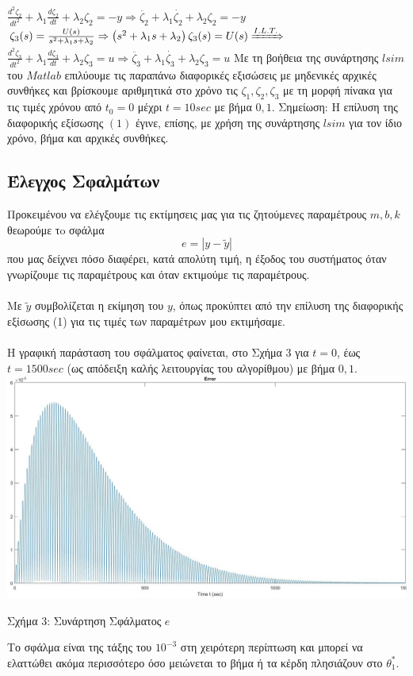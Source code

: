 \documentclass[12pt]{article}
\begin{document}
$ \frac{d^2\zeta_{2}}{dt^2} +\lambda_{1}\frac{d\zeta_{2}}{dt}+\lambda_{2}\zeta_{2}=-y \Rightarrow \ddot{\zeta_{2}} +\lambda_{1}\dot{\zeta_{2}}+\lambda_{2}\zeta_{2}=-y$
\newline
\newline
\newline
$\zeta_{3}(s)=\frac{U(s)}{s^2+\lambda_{1}s+\lambda_{2}} \Rightarrow \left( s^2+\lambda_{1}s+\lambda_{2} \right)\zeta_{3}(s) = U(s)\xRightarrow{I.L.T.}$
\newline
$ \frac{d^2\zeta_{3}}{dt^2} +\lambda_{1}\frac{d\zeta_{3}}{dt}+\lambda_{2}\zeta_{3}=u \Rightarrow \ddot{\zeta_{3}} +\lambda_{1}\dot{\zeta_{3}}+\lambda_{2}\zeta_{3}=u$
\newline
\newline
Με τη βοήθεια της συνάρτησης $lsim$ του $Matlab$ επιλύουμε τις παραπάνω διαφορικές εξισώσεις με μηδενικές αρχικές συνθήκες και βρίσκουμε αριθμητικά στο χρόνο τις $\zeta_{1},\zeta_{2},\zeta_{3}$ με τη μορφή πίνακα για τις τιμές χρόνου από $t_{0}=0$  μέχρι $t=10 sec$ με βήμα $0,1$.
\newline
\newline
Σημείωση: Η επίλυση της διαφορικής εξίσωσης $(1)$ έγινε, επίσης, με χρήση της συνάρτησης $lsim$ για τον ίδιο χρόνο, βήμα και αρχικές συνθήκες.
\subsection{Έλεγχος Σφαλμάτων}
Προκειμένου να ελέγξουμε τις εκτίμησεις μας για τις ζητούμενες παραμέτρους $m,b,k$ θεωρούμε τo σφάλμα
\[ e=|y-\widetilde{y}| \] 
που μας δείχνει πόσο διαφέρει, κατά απολύτη τιμή,  η έξοδος του συστήματος όταν γνωρίζουμε τις παραμέτρους και όταν εκτιμούμε τις παραμέτρους.
\\ \\
Με $\widetilde{y}$ συμβολίζεται η εκίμηση του $y$, όπως προκύπτει από την επίλυση της διαφορικής εξίσωσης (1) για τις τιμές των παραμέτρων μου εκτιμήσαμε.
\\ \\
Η γραφική παράσταση του σφάλματος φαίνεται, στο Σχήμα 3 για $t=0$, έως $t=1500sec$ (ως απόδειξη καλής λειτουργίας του αλγορίθμου) με βήμα $0,1$.
\\
\includegraphics[width=\linewidth]{sys1_error.jpg}
\centerline{Σχήμα 3: Συνάρτηση Σφάλματος $e$}
\newline
\newline
Το σφάλμα είναι της τάξης του $10^{-3}$ στη χειρότερη περίπτωση και μπορεί να ελαττώθει ακόμα περισσότερο όσο μειώνεται το βήμα ή τα κέρδη πλησιάζουν στο $θ_{1}^{*}$.
\newpage
\end{document}
